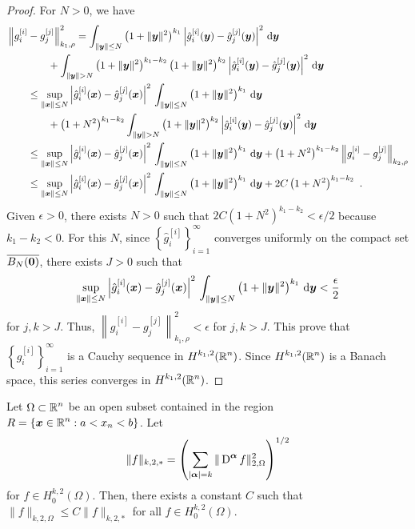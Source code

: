\begin{proof}
For $N>0$, we have
\begin{align*}
&\left\|g_i^{[i]} - g_j^{[j]} \right\|_{k_1,\rho}^2 =
\int_{\|\VEC{y}\|\leq N} \left(1+\|\VEC{y}\|^2\right)^{k_1}
\left| \hat{g}_i^{[i]}(\VEC{y}) - \hat{g}_j^{[j]}(\VEC{y})
\right|^2 \dx{\VEC{y}} \\
&\qquad \qquad +\int_{\|\VEC{y}\|> N} \left(1+\|\VEC{y}\|^2\right)^{k_1-k_2}
\left(1+\|\VEC{y}\|^2\right)^{k_2}
\left| \hat{g}_i^{[i]}(\VEC{y}) - \hat{g}_j^{[j]}(\VEC{y})
\right|^2 \dx{\VEC{y}} \\
&\qquad \leq \sup_{\|\VEC{x}\|\leq N}
\left| \hat{g}_i^{[i]}(\VEC{x}) - \hat{g}_j^{[j]}(\VEC{x}) \right|^2
\, \int_{\|\VEC{y}\|\leq N} \left(1+\|\VEC{y}\|^2\right)^{k_1}
\dx{\VEC{y}} \\
&\qquad \qquad + \left(1+N^2\right)^{k_1-k_2}
\int_{\|\VEC{y}\|> N} \left(1+\|\VEC{y}\|^2\right)^{k_2}
\left| \hat{g}_i^{[i]}(\VEC{y}) - \hat{g}_j^{[j]}(\VEC{y}) \right|^2
\dx{\VEC{y}} \\
&\qquad \leq \sup_{\|\VEC{x}\|\leq N}
\left| \hat{g}_i^{[i]}(\VEC{x}) - \hat{g}_j^{[j]}(\VEC{x}) \right|^2
\, \int_{\|\VEC{y}\|\leq N} \left(1+\|\VEC{y}\|^2\right)^{k_1}
\dx{\VEC{y}}
+ \left(1+N^2\right)^{k_1-k_2} \left\| g_i^{[i]}-g_j^{[j]}\right\|_{k_2,\rho} \\
&\qquad \leq \sup_{\|\VEC{x}\|\leq N}
\left| \hat{g}_i^{[i]}(\VEC{x}) - \hat{g}_j^{[j]}(\VEC{x}) \right|^2
\, \int_{\|\VEC{y}\|\leq N} \left(1+\|\VEC{y}\|^2\right)^{k_1}
\dx{\VEC{y}} +2C \left(1+N^2\right)^{k_1-k_2} \ .
\end{align*}
Given $\epsilon>0$, there exists $N>0$ such that
$\displaystyle 2C \left(1+N^2\right)^{k_1-k_2} < \epsilon/2$ because $k_1-k_2<0$.
For this $N$, since $\displaystyle \left\{ \hat{g}_i^{[i]} \right\}_{i=1}^\infty$
converges uniformly on the compact set $\overline{B_N({\bm{0}})}$,
there exists $J>0$ such that
\[
\sup_{\|{\bm{x}}\|\leq N}
\left| \hat{g}_i^{[i]}({\bm{x}}) - \hat{g}_j^{[j]}({\bm{x}}) \right|^2
\, \int_{\|{\bm{y}}\|\leq N} \left(1+\|{\bm{y}}\|^2\right)^{k_1}
\,\mathrm{d}{{\bm{y}}} < \frac{\epsilon}{2}
\]
for $j,k > J$.  Thus,
$\displaystyle \left\|g_i^{[i]} - g_j^{[j]}\right\|_{k_1,\rho}^2 < \epsilon$
for $j,k > J$.
This prove that $\displaystyle \left\{g_i^{[i]} \right\}_{i=1}^\infty$
is a Cauchy sequence in
$\displaystyle H^{k_1,2}(\mathbb{R}^n)$.  Since $\displaystyle H^{k_1,2}(\mathbb{R}^n)$
is a Banach space, this series converges in
$\displaystyle H^{k_1,2}(\mathbb{R}^n)$.
\end{proof}

\begin{theorem} \label{sob_pt_carre}
Let $\displaystyle \Omega \subset \mathbb{R}^n$ be an open subset contained
in the region $\displaystyle R= \{ {\bm{x}} \in \mathbb{R}^n : a < x_n < b \}$.  Let
\begin{equation} \label{sob_pc_norm}
\|f \|_{k,2,\ast} = \left( \sum_{|{\bm{\alpha}}|=k}
\| \operatorname{D}^{{\bm{\alpha}}} f \|_{2,\Omega}^2 \right)^{1/2}
\end{equation}
for $\displaystyle f \in H^{k,2}_0(\Omega)$.
Then, there exists a constant $C$ such that
$\displaystyle \|f\|_{k,2,\Omega} \leq C \| f \|_{k,2,\ast}$ for
all $\displaystyle f \in H^{k,2}_0(\Omega)$.
\end{theorem}

